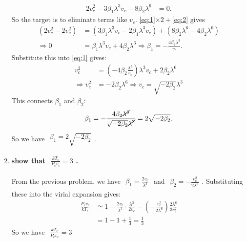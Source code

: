 \documentclass[../../main.tex]{subfiles}
\begin{document}
\begin{enumerate}
\begin{align}
    2v_{c}^{2} - 3\beta_{1}\lambda^{3}v_{c} - 8\beta_{2}\lambda^{6} &= 0.\label{eq:2}
  \end{align}
  So the target is to eliminate terms like $v_{c}$. \eqref{eq:1}$\times 2 + $\eqref{eq:2} gives
  \begin{align*}
    (2v_{c}^{2} - 2v_{c}^{2}) &= (3\beta_{1}\lambda^{3}v_{c} - 2\beta_{1}\lambda^{3}v_{c}) + (8\beta_{2}\lambda^{6} - 4\beta_{2}\lambda^{6})\\
    \Rightarrow 0 &= \beta_{1}\lambda^{3}v_{c} + 4\beta_{2}\lambda^{6}\Rightarrow \boxed{\beta_{1} = -\frac{4\beta_{2}\lambda^{3}}{v_{c}}}.
  \end{align*}
  Substitute this into \eqref{eq:1} gives:
  \begin{align*}
    v_{c}^{2} &= \left(-4\beta_{2}\frac{\lambda^{3}}{v_{c}}\right)\lambda^{3}v_{c} + 2\beta_{2}\lambda^{6}\\
    \Rightarrow v_{c}^{2} &= -2\beta_{2}\lambda^{6}\Rightarrow \boxed{v_{c} = \sqrt{-2\beta_{2}}\lambda^{3}}
  \end{align*}
  This connects $\beta_{1}$ and $\beta_{2}$:
  \begin{align*}
    \beta_{1} = -\frac{4\beta_{2}\cancel{\lambda^{3}}}{\sqrt{-2\beta_{2}}\cancel{\lambda^{3}}} = 2\sqrt{-2\beta_{2}}.
  \end{align*}
  So we have $\begin{aligned}
    \boxed{\beta_{1} = 2\sqrt{-2\beta_{2}}}
  \end{aligned}$.

    \item \textbf{show that $\begin{aligned}
      \frac{kT_{c}}{P_{c}v_{c}} = 3
    \end{aligned}$.}

    From the previous problem, we have $\begin{aligned}
      \beta_{1} = \frac{2v_{c}}{\lambda^{3}}
    \end{aligned}$ and $\begin{aligned}
      \beta_{2} = -\frac{v_{c}^{2}}{2\lambda^{6}}
    \end{aligned}$. Substituting these into the virial expansion gives:
    \begin{align*}
      \frac{P_{c}v_{c}}{kT_{c}} &\simeq 1 - \frac{2v_{c}}{\lambda^{3}} \cdot\frac{\lambda^{3}}{2v_{c}} - \left(-\frac{v_{c}^{2}}{2\lambda^{6}}\right)\frac{2\lambda^{6}}{3v_{c}^{2}}\\
      &= 1 - 1 + \frac{1}{3} = \frac{1}{3}
    \end{align*}
    So we have $\begin{aligned}
      \boxed{\frac{kT_{c}}{P_{c}v_{c}} = 3}
    \end{aligned}$
  \end{enumerate}
\end{document}
